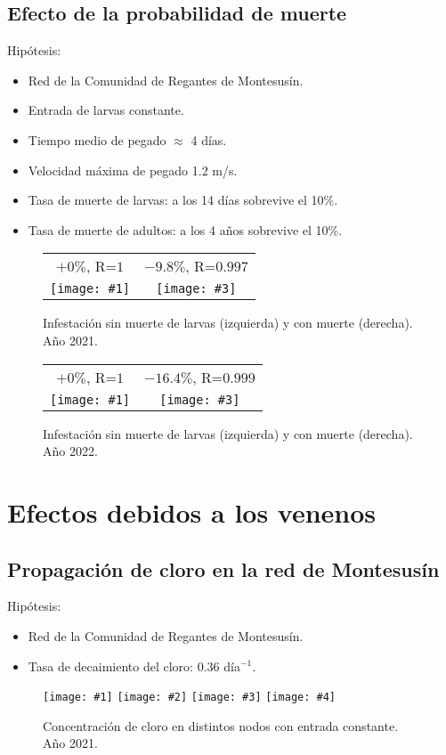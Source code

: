 \documentclass[a4paper]{article}
\newcommand{\FIGIIB}[6]
{
	\begin{figure}[ht!]
		\centering
		\begin{tabular}{cc}
			#2&#4\\
			\texttt{[image: \#1]}&
			\texttt{[image: \#3]}\\
		\end{tabular}
		\caption{#5.\label{#6}}
	\end{figure}
}
\newcommand{\FIGIV}[6]
{
	\begin{figure}[ht!]
		\centering
		\texttt{[image: \#1]}
		\texttt{[image: \#2]}
		\texttt{[image: \#3]}
		\texttt{[image: \#4]}
		\caption{#5.\label{#6}}
	\end{figure}
}
\begin{document}
\clearpage
\subsection{Efecto de la probabilidad de muerte}

Hipótesis:
\begin{itemize}
\item Red de la Comunidad de Regantes de Montesusín.
\item Entrada de larvas constante.
\item Tiempo medio de pegado $\approx$ 4 días.
\item Velocidad máxima de pegado 1.2 m/s.
\item Tasa de muerte de larvas: a los 14 días sobrevive el 10\%.
\item Tasa de muerte de adultos: a los 4 años sobrevive el 10\%.
\end{itemize}

\FIGIIB{2021-mussel-constant.pdf}{$+0\%$, R=$1$}
{2021-mussel-death.pdf}{$-9.8\%$, R=$0.997$}
{Infestación sin muerte
de larvas (izquierda) y con muerte (derecha). Año 2021}{Fig2021MusselDeath}

\FIGIIB{2022-mussel-constant.pdf}{$+0\%$, R=$1$}
{2022-mussel-death.pdf}{$-16.4\%$, R=$0.999$}
{Infestación sin muerte
de larvas (izquierda) y con muerte (derecha). Año 2022}{Fig2022MusselDeath}

\clearpage
\section{Efectos debidos a los venenos}

\subsection{Propagación de cloro en la red de Montesusín}

Hipótesis:
\begin{itemize}
\item Red de la Comunidad de Regantes de Montesusín.
\item Tasa de decaimiento del cloro: 0.36 día$^{-1}$.
\end{itemize}

\FIGIV{24-0.36-2021-chlorine-constant-0.eps}{24-0.36-2021-chlorine-constant-2.eps}
{24-0.36-2021-chlorine-constant-6665.eps}{24-0.36-2021-chlorine-constant-172.eps}
{Concentración de cloro en distintos nodos con entrada constante. Año 2021}
{Fig0362021ChlorineConstant}
\end{document}
